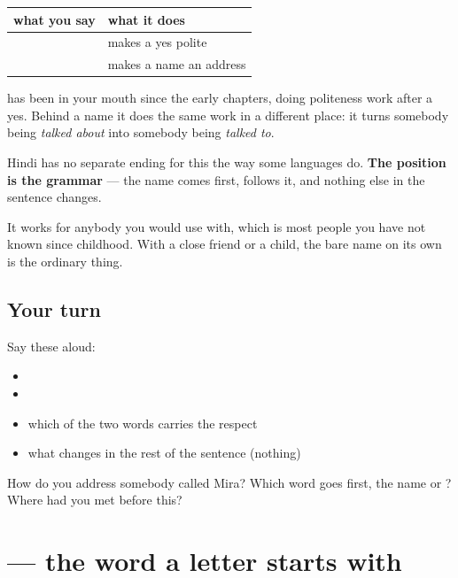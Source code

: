 \begin{grammarlens}[title={Grammar Lens: the word you already had, in a new position}]
\noindent
\begin{tabularx}{\linewidth}{@{}>{\raggedright\arraybackslash}X>{\raggedright\arraybackslash}X@{}}
\toprule
\textbf{what you say} & \textbf{what it does} \\
\midrule
\hi{जी} \hi{हाँ} & makes a yes polite \\
\hi{मीरा} \hi{जी} & makes a name an address \\
\bottomrule
\end{tabularx}

\textbf{} has been in your mouth since the early chapters, doing politeness work after a yes. Behind a name it does the same work in a different place: it turns somebody being \emph{talked about} into somebody being \emph{talked to}.

Hindi has no separate ending for this the way some languages do. \textbf{The position is the grammar} — the name comes first, \textbf{} follows it, and nothing else in the sentence changes.

It works for anybody you would use \textbf{} with, which is most people you have not known since childhood. With a close friend or a child, the bare name on its own is the ordinary thing.
\end{grammarlens}

\subsection*{Your turn}
Say these aloud:

\begin{itemize}
\raggedright
  \item {} 
  \item {} 
  \item which of the two words carries the respect
  \item what changes in the rest of the sentence (nothing)
\end{itemize}

\begin{tcolorbox}[breakable,colback=teal!4,colframe=teal!35!black,title={Before you move on}]
How do you address somebody called Mira? Which word goes first, the name or \textbf{}? Where had you met \textbf{} before this?
\end{tcolorbox}
\section[\texorpdfstring{\hi{प्रिय} (priya)}{प्रिय (priya)}]{ — the word a letter starts with}

